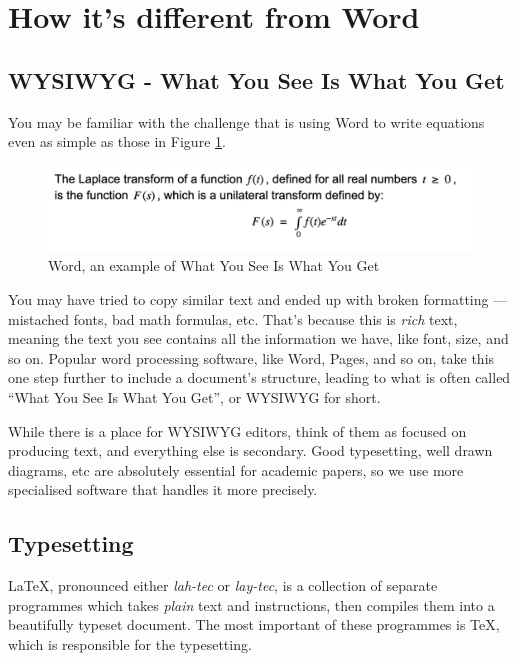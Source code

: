 \section{How it's different from Word}
    \subsection{WYSIWYG - What You See Is What You Get}
        You may be familiar with the challenge that is using Word to write equations even as simple as those in Figure \ref{fig:word}.

        \begin{figure}[h]
            \centering
            \includegraphics[scale=0.8]{figures/word.png}
            \caption{Word, an example of What You See Is What You Get}
            \label{fig:word}
        \end{figure}

        You may have tried to copy similar text and ended up with broken formatting --- mistached fonts, bad math formulas, etc.
        That's because this is \emph{rich} text, meaning the text you see contains all the information we have, like font, size, and so on.
        Popular word processing software, like Word, Pages, and so on, take this one step further to include a document's structure, leading to what is often called ``What You See Is What You Get'', or WYSIWYG for short.

        While there is a place for WYSIWYG editors, think of them as focused on producing text, and everything else is secondary.
        Good typesetting, well drawn diagrams, etc are absolutely essential for academic papers, so we use more specialised software that handles it more precisely.

    \subsection{Typesetting}
        \LaTeX, pronounced either \emph{lah-tec} or \emph{lay-tec}, is a collection of separate programmes which takes \emph{plain} text and instructions, then compiles them into a beautifully typeset document.
        The most important of these programmes is \TeX{}, which is responsible for the typesetting.

